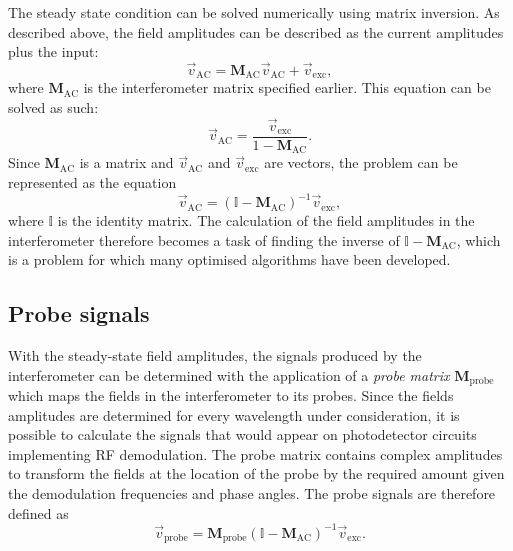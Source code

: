 The steady state condition can be solved numerically using matrix inversion. As described above, the field amplitudes can be described as the current amplitudes plus the input:
\begin{equation}
  \vec{v}_{\text{AC}} = \mathbf{M}_{\text{AC}} \vec{v}_{\text{AC}} + \vec{v}_{\text{exc}},
\end{equation}
where $\mathbf{M}_{\text{AC}}$ is the interferometer matrix specified earlier. This equation can be solved as such:
\begin{equation}
  \vec{v}_{\text{AC}} = \frac{\vec{v}_{\text{exc}}}{1 - \mathbf{M}_{\text{AC}}}.
\end{equation}
Since $\mathbf{M}_{\text{AC}}$ is a matrix and $\vec{v}_{\text{AC}}$ and $\vec{v}_{\text{exc}}$ are vectors, the problem can be represented as the equation
\begin{equation}
  \vec{v}_{\text{AC}} = \left( \mathbb{I} - \mathbf{M}_{\text{AC}} \right)^{-1} \vec{v}_{\text{exc}},
\end{equation}
where $\mathbb{I}$ is the identity matrix. The calculation of the field amplitudes in the interferometer therefore becomes a task of finding the inverse of $\mathbb{I} - \mathbf{M}_{\text{AC}}$, which is a problem for which many optimised algorithms have been developed.

\subsection{Probe signals}
With the steady-state field amplitudes, the signals produced by the interferometer can be determined with the application of a \emph{probe matrix} $\mathbf{M}_{\text{probe}}$ which maps the fields in the interferometer to its probes. Since the fields amplitudes are determined for every wavelength under consideration, it is possible to calculate the signals that would appear on photodetector circuits implementing \gls{RF} demodulation. The probe matrix contains complex amplitudes to transform the fields at the location of the probe by the required amount given the demodulation frequencies and phase angles. The probe signals are therefore defined as
\begin{equation}
  \vec{v}_{\text{probe}} = \mathbf{M}_{\text{probe}} \left( \mathbb{I} - \mathbf{M}_{\text{AC}} \right)^{-1} \vec{v}_{\text{exc}}.
\end{equation}

